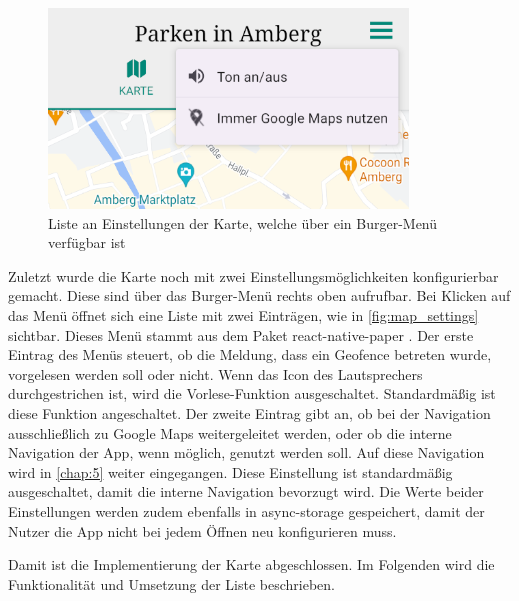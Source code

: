 \begin{figure}
	\vspace{-\baselineskip}
	\centering
	\includegraphics[scale=1]{img/map_settings}
	\caption{Liste an Einstellungen der Karte, welche über ein Burger-Menü verfügbar ist}
	\label{fig:map_settings}
\end{figure}
Zuletzt wurde die Karte noch mit zwei Einstellungsmöglichkeiten konfigurierbar gemacht. Diese sind über das Burger-Menü rechts oben aufrufbar. Bei Klicken auf das Menü öffnet sich eine Liste mit zwei Einträgen, wie in \autoref{fig:map_settings} sichtbar. Dieses Menü stammt aus dem Paket react-native-paper \cite{paper}. Der erste Eintrag des Menüs steuert, ob die Meldung, dass ein Geofence betreten wurde, vorgelesen werden soll oder nicht. Wenn das Icon des Lautsprechers durchgestrichen ist, wird die Vorlese-Funktion ausgeschaltet. Standardmäßig ist diese Funktion angeschaltet. Der zweite Eintrag gibt an, ob bei der Navigation ausschließlich zu Google Maps weitergeleitet werden, oder ob die interne Navigation der App, wenn möglich, genutzt werden soll. Auf diese Navigation wird in \autoref{chap:5} weiter eingegangen. Diese Einstellung ist standardmäßig ausgeschaltet, damit die interne Navigation bevorzugt wird. Die Werte beider Einstellungen werden zudem ebenfalls in async-storage gespeichert, damit der Nutzer die App nicht bei jedem Öffnen neu konfigurieren muss.

Damit ist die Implementierung der Karte abgeschlossen. Im Folgenden wird die Funktionalität und Umsetzung der Liste beschrieben.

